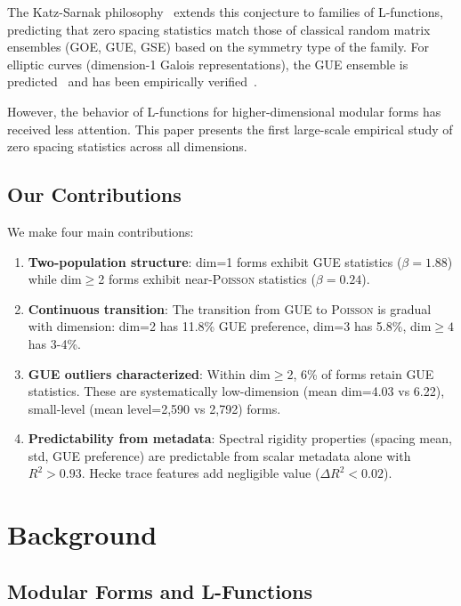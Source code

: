 \documentclass[11pt, a4paper]{article}
\newcommand{\GUE}{\textsc{GUE}}
\newcommand{\GOE}{\textsc{GOE}}
\newcommand{\GSE}{\textsc{GSE}}
\newcommand{\Poisson}{\textsc{Poisson}}
\begin{document}
The Katz-Sarnak philosophy~\cite{katzsarnak1999} extends this conjecture to families of L-functions, predicting that zero spacing statistics match those of classical random matrix ensembles (\GOE{}, \GUE{}, \GSE{}) based on the symmetry type of the family. For elliptic curves (dimension-1 Galois representations), the \GUE{} ensemble is predicted~\cite{katzsarnak1999} and has been empirically verified~\cite{odlyzko1987}.

However, the behavior of L-functions for higher-dimensional modular forms has received less attention. This paper presents the first large-scale empirical study of zero spacing statistics across all dimensions.

\subsection{Our Contributions}

We make four main contributions:

\begin{enumerate}
\item {\bfseries Two-population structure}: dim=1 forms exhibit \GUE{} statistics ($\beta=1.88$) while dim$\geq$2 forms exhibit near-\Poisson{} statistics ($\beta=0.24$).

\item {\bfseries Continuous transition}: The transition from \GUE{} to \Poisson{} is gradual with dimension: dim=2 has 11.8\% \GUE{} preference, dim=3 has 5.8\%, dim$\geq 4$ has 3-4\%.

\item {\bfseries \GUE{} outliers characterized}: Within dim$\geq$2, 6\% of forms retain \GUE{} statistics. These are systematically low-dimension (mean dim=4.03 vs 6.22), small-level (mean level=2,590 vs 2,792) forms.

\item {\bfseries Predictability from metadata}: Spectral rigidity properties (spacing mean, std, \GUE{} preference) are predictable from scalar metadata alone with $R^2>0.93$. Hecke trace features add negligible value ($\Delta R^2<0.02$).
\end{enumerate}

\section{Background}
\label{sec:background}

\subsection{Modular Forms and L-Functions}
\end{document}
